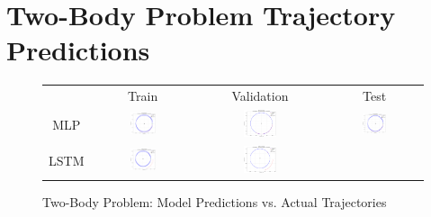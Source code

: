 \documentclass[12pt,a4paper]{article}
\begin{document}
\section{Two-Body Problem Trajectory Predictions}
\begin{figure}[H]
  \centering
  \caption{Two-Body Problem: Model Predictions vs. Actual Trajectories}
  \label{fig:two_body_predictions}
  \begin{tabular}{cccc}
      & Train & Validation & Test \\
      MLP &
      \includegraphics[width=0.27\textwidth]{../inference_results/train/MLP/two_body/500/full_trajectory_spaceship_0.png} &
      \includegraphics[width=0.27\textwidth]{../inference_results/val/MLP/two_body/500/full_trajectory_spaceship_0.png} &
      \includegraphics[width=0.27\textwidth]{../inference_results/test/MLP/two_body/500/full_trajectory_spaceship_0.png} \\
      LSTM &
      \includegraphics[width=0.27\textwidth]{../inference_results/train/LSTM/two_body/500/full_trajectory_spaceship_0.png} &
      \includegraphics[width=0.27\textwidth]{../inference_results/val/LSTM/two_body/500/full_trajectory_spaceship_0.png} &

\end{tabular}
\end{figure}
\end{document}
